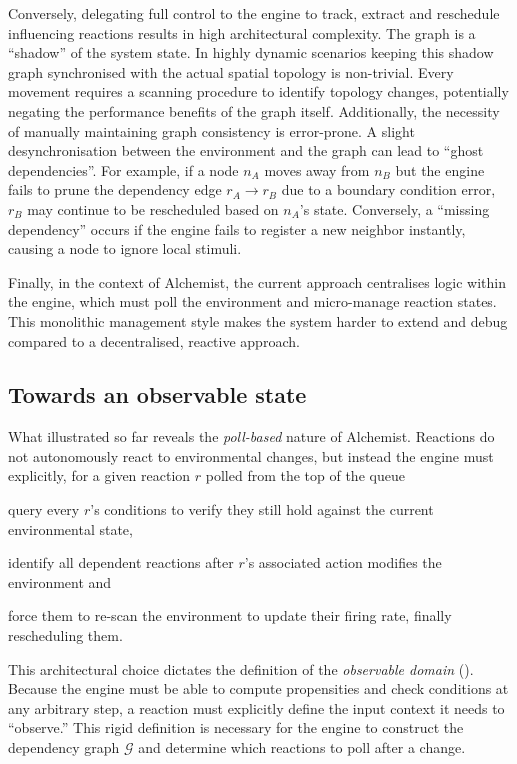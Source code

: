 Conversely, delegating full control to the engine to track, extract and
reschedule influencing reactions results in high architectural complexity. The
graph is a ``shadow'' of the system state. In highly dynamic scenarios keeping
this shadow graph synchronised with the actual spatial topology is non-trivial.
Every movement requires a scanning procedure to identify topology changes,
potentially negating the performance benefits of the graph itself.
Additionally, the necessity of manually maintaining graph consistency is
error-prone. A slight desynchronisation between the environment and the graph
can lead to ``ghost dependencies''. For example, if a node $n_A$ moves away
from $n_B$ but the engine fails to prune the dependency edge $r_A \to r_B$ due
to a boundary condition error, $r_B$ may continue to be rescheduled based on
$n_A$'s state. Conversely, a ``missing dependency'' occurs if the engine fails
to register a new neighbor instantly, causing a node to ignore local stimuli.

Finally, in the context of Alchemist, the current approach centralises logic
within the engine, which must poll the environment and micro-manage reaction
states. This monolithic management style makes the system harder to extend and
debug compared to a decentralised, reactive approach.

\subsection{Towards an observable
	state}\label{ssec:reactive_alchemist_principles}
What illustrated so far reveals the \emph{poll-based} nature of Alchemist.
Reactions do not autonomously react to environmental changes, but instead the
engine must explicitly, for a given reaction $r$ polled from the top of the
queue
%
\begin{enumerate*}[label=(\roman*)]
	\item query every $r$'s conditions to verify they still hold against
	      the current environmental state,
	\item identify all dependent reactions after $r$'s associated action
	      modifies the environment and
	\item force them to re-scan the environment to update their firing rate,
	      finally rescheduling them.
\end{enumerate*}

This architectural choice dictates the definition of the \emph{observable
	domain} (). Because the engine must be able to compute propensities and check
conditions at any arbitrary step, a reaction must explicitly define the input
context it needs to ``observe.'' This rigid definition is necessary for the
engine to construct the dependency graph $\mathcal{G}$ and determine which
reactions to poll after a change.

